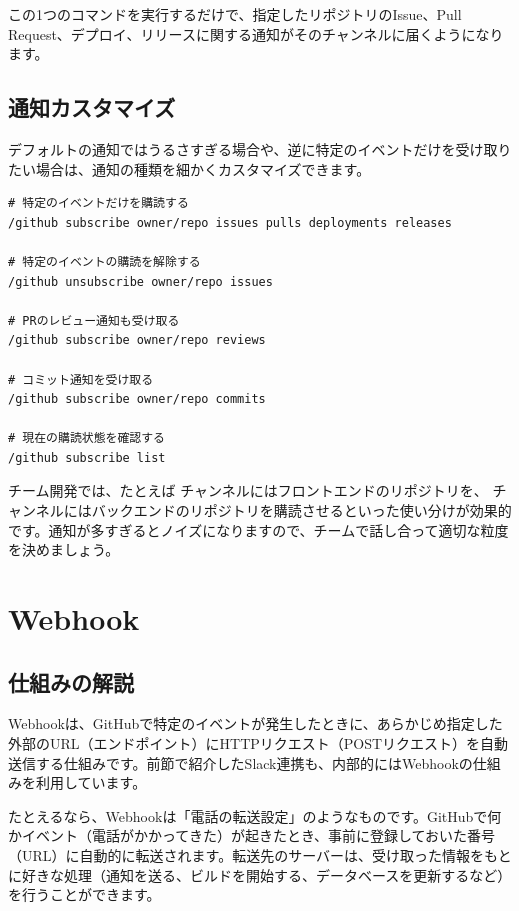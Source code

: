 この1つのコマンドを実行するだけで、指定したリポジトリのIssue、Pull Request、デプロイ、リリースに関する通知がそのチャンネルに届くようになります。

\subsection{通知カスタマイズ}

デフォルトの通知ではうるさすぎる場合や、逆に特定のイベントだけを受け取りたい場合は、通知の種類を細かくカスタマイズできます。

\begin{lstlisting}[language={}]
# 特定のイベントだけを購読する
/github subscribe owner/repo issues pulls deployments releases

# 特定のイベントの購読を解除する
/github unsubscribe owner/repo issues

# PRのレビュー通知も受け取る
/github subscribe owner/repo reviews

# コミット通知を受け取る
/github subscribe owner/repo commits

# 現在の購読状態を確認する
/github subscribe list
\end{lstlisting}

チーム開発では、たとえば  チャンネルにはフロントエンドのリポジトリを、 チャンネルにはバックエンドのリポジトリを購読させるといった使い分けが効果的です。通知が多すぎるとノイズになりますので、チームで話し合って適切な粒度を決めましょう。

\section{Webhook}

\subsection{仕組みの解説}

Webhookは、GitHubで特定のイベントが発生したときに、あらかじめ指定した外部のURL（エンドポイント）にHTTPリクエスト（POSTリクエスト）を自動送信する仕組みです。前節で紹介したSlack連携も、内部的にはWebhookの仕組みを利用しています。

たとえるなら、Webhookは「電話の転送設定」のようなものです。GitHubで何かイベント（電話がかかってきた）が起きたとき、事前に登録しておいた番号（URL）に自動的に転送されます。転送先のサーバーは、受け取った情報をもとに好きな処理（通知を送る、ビルドを開始する、データベースを更新するなど）を行うことができます。

